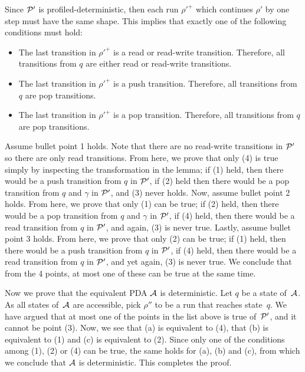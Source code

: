 Since $\mathcal{P}'$ is profiled-deterministic, then each run $\rho'^+$ which continues $\rho'$ by one step must have the same shape. This implies that exactly one of the following conditions must hold:
\begin{itemize}
	\item The last transition in $\rho'^+$ is a read or read-write transition. Therefore, all transitions from $q$ are either read or read-write transitions.
	\item The last transition in $\rho'^+$ is a push transition. Therefore, all transitions from $q$ are pop transitions.
	\item The last transition in $\rho'^+$ is a pop transition. Therefore, all transitions from $q$ are pop transitions.
\end{itemize}
 Assume bullet point 1 holds. Note that there are no read-write transitions in $\mathcal{P}'$ so there are only read transitions. From here, we prove that only (4) is true simply by inspecting the transformation in the lemma; if (1) held, then there would be a push transition from $q$ in $\mathcal{P}'$, if (2) held then there would be a pop transition from $q$ and $\gamma$ in $\mathcal{P}'$, and (3) never holds. Now, assume bullet point 2 holds. From here, we prove that only (1) can be true; if (2) held, then there would be a pop transition from $q$ and $\gamma$ in $\mathcal{P}'$, if (4) held, then there would be a read transition from $q$ in $\mathcal{P}'$, and again, (3) is never true. Lastly, assume bullet point 3 holds. From here, we prove that only (2) can be true; if (1) held, then there would be a push transition from $q$ in $\mathcal{P}'$, if (4) held, then there would be a read transition from $q$ in $\mathcal{P}'$, and yet again, (3) is never true. We conclude that from the 4 points, at most one of these can be true at the same time.

%
Now we prove that the equivalent PDA $\mathcal{A}$ is deterministic.
Let $q$ be a state of~$\mathcal{A}$. As all states of~$\mathcal{A}$ are accessible, pick $\rho''$ to be a run that reaches state~$q$. We have argued that at most one of the points in the list above is true of~$\mathcal{P}'$, and it cannot be point (3). Now,
we see that (a) is equivalent to (4), that (b) is equivalent to (1) and (c) is equivalent to (2). Since only one of the conditions among (1), (2) or (4) can be true, the same holds for (a), (b) and (c), from which we conclude that $\mathcal{A}$ is deterministic. This completes the proof.
